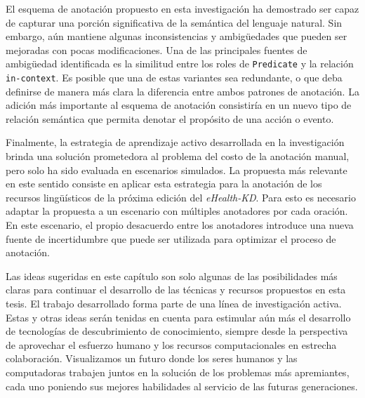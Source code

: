 El esquema de anotación propuesto en esta investigación ha demostrado ser capaz de capturar una porción significativa de la semántica del lenguaje natural. Sin embargo, aún mantiene algunas inconsistencias y ambigüedades que pueden ser mejoradas con pocas modificaciones. 
Una de las principales fuentes de ambigüedad identificada es la similitud entre los roles de \texttt{Predicate} y la relación \texttt{in-context}. Es posible que una de estas variantes sea redundante, o que deba definirse de manera más clara la diferencia entre ambos patrones de anotación.
La adición más importante al esquema de anotación consistiría en un nuevo tipo de relación semántica que permita denotar el propósito de una acción o evento.

Finalmente, la estrategia de aprendizaje activo desarrollada en la investigación brinda una solución prometedora al problema del costo de la anotación manual, pero solo ha sido evaluada en escenarios simulados.
La propuesta más relevante en este sentido consiste en aplicar esta estrategia para la anotación de los recursos lingüísticos de la próxima edición del \textit{eHealth-KD}.
Para esto es necesario adaptar la propuesta a un escenario con múltiples anotadores por cada oración.
En este escenario, el propio desacuerdo entre los anotadores introduce una nueva fuente de incertidumbre que puede ser utilizada para optimizar el proceso de anotación.

Las ideas sugeridas en este capítulo son solo algunas de las posibilidades más claras para continuar el desarrollo de las técnicas y recursos propuestos en esta tesis. El trabajo desarrollado forma parte de una línea de investigación activa. Estas y otras ideas serán tenidas en cuenta para estimular aún más el desarrollo de tecnologías de descubrimiento de conocimiento, siempre desde la perspectiva de aprovechar el esfuerzo humano y los recursos computacionales en estrecha colaboración. Visualizamos un futuro donde los seres humanos y las computadoras trabajen juntos en la solución de los problemas más apremiantes, cada uno poniendo sus mejores habilidades al servicio de las futuras generaciones.
